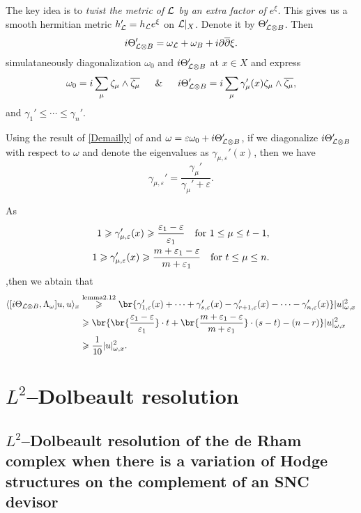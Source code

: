 \documentclass[lang=en,12pt]{beautybook}
\newcommand{\pr}{'}
\begin{document}
The key idea is to \emph{twist the metric of ${\mathcal L}$ by an extra factor of $e^\xi$.} This gives us a smooth hermitian metric $h_{\mL}\pr =h_{\mL}e^\xi$ on ${\mathcal L}|_X$. Denote it by $\Theta\pr_{\mL\otimes B}$. Then
\[
  i\Theta\pr_{\mL\otimes B}=\omega_\mL +\omega_B+i\bd\bdd\xi.
\]
simulataneously diagonalization $\omega_0$ and  $i\Theta\pr_{\mL\otimes B}$ at $x\in X$ and express 
\[
  \omega_0=i\sum_{\mu} \zeta_\mu\wedge\overline{\zeta_\mu}\quad\And\quad i\Theta\pr_{\mL\otimes B}=i\sum_{\mu} \gamma_\mu\pr(x)\zeta_\mu\wedge\overline{\zeta_\mu},
\]
and $\gamma_1\pr\leqslant\cdots \leqslant \gamma_n\pr $.

Using the result of \ref{Demailly} of  and $\omega=\varepsilon\omega_0+i\Theta\pr_{\mL\otimes B}$, if we diagonalize $i\Theta\pr_{\mL\otimes B}$ with respect to $\omega$ and denote the eigenvalues as $\gamma_{\mu,\varepsilon}\pr(x)$, then we have \[\gamma_{\mu,\varepsilon}\pr=\frac{\gamma_\mu\pr}{\gamma_\mu\pr+\varepsilon}.\]

As 
\begin{align*}
  1\geqslant \gamma_{\mu,\varepsilon}\pr(x)\geqslant \frac{\varepsilon_1-\varepsilon}{\varepsilon_1} \text{\quad for } 1\leq \mu\leq t-1,\\ 
  1\geqslant \gamma_{\mu,\varepsilon}\pr(x)\geqslant \frac{m+\varepsilon_1-\varepsilon}{m+\varepsilon_1} \text{\quad for } t\leq \mu\leq n.
\end{align*}
  ,then we abtain that \cite{kim20232}
  \begin{align*}
    \langle [i\Theta_{\mL\otimes B},\Lambda_\omega]u,u\rangle_x &\stackrel{\text{lemma2.12}}{\geqslant } \br{\gamma_{1,\varepsilon}\pr(x)+\cdots+\gamma_{s,\varepsilon}\pr(x)-\gamma_{r+1,\varepsilon}\pr(x)-\cdots-\gamma_{n,\varepsilon}\pr(x)}|u|^2_{\omega,x}\\
    &\geqslant \br{\br{\frac{\varepsilon_1-\varepsilon}{\varepsilon_1}}\cdot t+\br{\frac{m+\varepsilon_1-\varepsilon}{m+\varepsilon_1}}\cdot (s-t)-(n-r)}|u|^2_{\omega,x}\\ 
    &\geqslant \frac{1}{10}|u|^2_{\omega,x}.
  \end{align*}
    
\section{\texorpdfstring{$L^2$}{}--Dolbeault resolution}

\subsection{\texorpdfstring{$L^2$}{}--Dolbeault resolution of the de Rham complex when there is a variation of Hodge structures on the complement of an SNC devisor}
\end{document}
